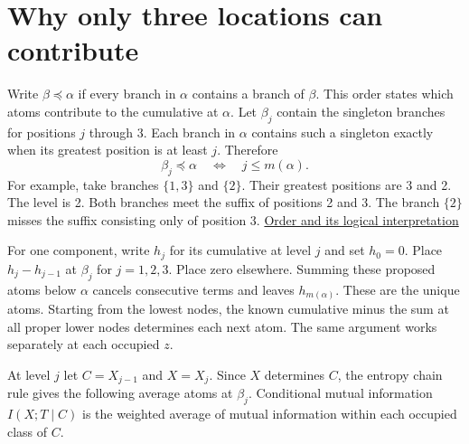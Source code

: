 \clearpage

\section{Why only three locations can contribute}\label{why-only-three-locations-can-contribute}

Write \(\beta\preceq\alpha\) if every branch in \(\alpha\) contains a branch of \(\beta\). This order states which atoms contribute to the cumulative at \(\alpha\). Let \(\beta_j\) contain the singleton branches for positions \(j\) through 3. Each branch in \(\alpha\) contains such a singleton exactly when its greatest position is at least \(j\). Therefore \[
\beta_j\preceq\alpha\quad\Longleftrightarrow\quad j\le m(\alpha).
\] For example, take branches \(\{1,3\}\) and \(\{2\}\). Their greatest positions are 3 and 2. The level is 2. Both branches meet the suffix of positions 2 and 3. The branch \(\{2\}\) misses the suffix consisting only of position 3. \href{https://doi.org/10.1098/rspa.2021.0110}{Order and its logical interpretation}

For one component, write \(h_j\) for its cumulative at level \(j\) and set \(h_0=0\). Place \(h_j-h_{j-1}\) at \(\beta_j\) for \(j=1,2,3\). Place zero elsewhere. Summing these proposed atoms below \(\alpha\) cancels consecutive terms and leaves \(h_{m(\alpha)}\). These are the unique atoms. Starting from the lowest nodes, the known cumulative minus the sum at all proper lower nodes determines each next atom. The same argument works separately at each occupied \(z\).

At level \(j\) let \(C=X_{j-1}\) and \(X=X_j\). Since \(X\) determines \(C\), the entropy chain rule gives the following average atoms at \(\beta_j\). Conditional mutual information \(I(X;T\mid C)\) is the weighted average of mutual information within each occupied class of \(C\).

